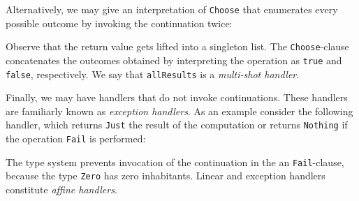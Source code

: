 \documentclass[preprint,numbers]{sigplanconf}
\newcommand{\msgbox}[2]{{%
  \par\noindent\small\color{red}%
  \framebox{\parbox{\dimexpr\linewidth-2\fboxsep-2\fboxrule}{\textbf{#1:} #2}}%
}}
\newcommand{\kc}[1]{\msgbox{KC}{#1}}
\begin{document}
Alternatively, we may give an interpretation of \lstinline$Choose$
that enumerates every possible outcome by invoking the continuation
twice:
%

%
Observe that the return value gets lifted into a singleton list. The
\lstinline$Choose$-clause concatenates the outcomes obtained by
interpreting the operation as \lstinline$true$ and \lstinline$false$,
respectively. We say that \lstinline$allResults$ is a \emph{multi-shot
  handler}.

Finally, we may have handlers that do not invoke continuations. These
handlers are familiarly known as \emph{exception handlers}. As an
example consider the following handler, which returns
\lstinline$Just$ the result of the computation or returns
\lstinline$Nothing$ if the operation \lstinline$Fail$ is performed:
%

%
The type system prevents invocation of the continuation in the an
\lstinline$Fail$-clause, because the type \lstinline$Zero$ has zero
inhabitants. Linear and exception handlers constitute \emph{affine
  handlers}.

\end{document}

